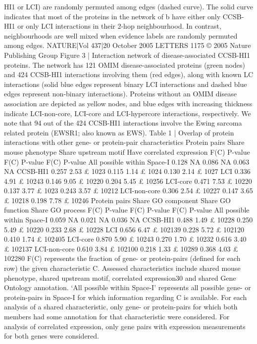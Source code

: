 HI1 or LCI) are randomly permuted among edges (dashed curve). The solid
curve indicates that most of the proteins in the network of b have either only
CCSB-HI1 or only LCI interactions in their 2-hop neighbourhood. In
contrast, neighbourhoods are well mixed when evidence labels are randomly
permuted among edges.
NATURE|Vol 437|20 October 2005
LETTERS
1175
© 2005 Nature Publishing Group
Figure 3 | Interaction network of disease-associated CCSB-HI1
proteins. The network has 121 OMIM disease-associated proteins (green
nodes) and 424 CCSB-HI1 interactions involving them (red edges), along
with known LC interactions (solid blue edges represent binary LCI
interactions and dashed blue edges represent non-binary interactions).
Proteins without an OMIM disease association are depicted as yellow nodes,
and blue edges with increasing thickness indicate LCI-non-core, LCI-core
and LCI-hypercore interactions, respectively. We note that 94 out of the 424
CCSB-HI1 interactions involve the Ewing sarcoma related protein (EWSR1;
also known as EWS).
Table 1 | Overlap of protein interactions with other gene- or protein-pair characteristics
Protein pairs
Share mouse phenotype
Share upstream motif
Have correlated expression
F(C)
P-value
F(C)
P-value
F(C)
P-value
All possible within Space-I
0.128
NA
0.086
NA
0.063
NA
CCSB-HI1
0.257
2.53 £ 1023
0.115
1.14 £ 1024
0.130
2.14 £ 1027
LCI
0.336
4.91 £ 10243
0.146
9.05 £ 10220
0.204
5.45 £ 10256
LCI-core
0.471
7.53 £ 10220
0.137
3.77 £ 1023
0.243
3.57 £ 10212
LCI-non-core
0.306
2.54 £ 10227
0.147
3.65 £ 10218
0.198
7.78 £ 10246
Protein pairs
Share GO component
Share GO function
Share GO process
F(C)
P-value
F(C)
P-value
F(C)
P-value
All possible within Space-I
0.059
NA
0.021
NA
0.036
NA
CCSB-HI1
0.488
1.49 £ 10228
0.250
5.49 £ 10220
0.233
2.68 £ 10228
LCI
0.656
6.47 £ 102139
0.228
5.72 £ 102120
0.410
1.74 £ 102405
LCI-core
0.870
5.90 £ 10243
0.270
1.70 £ 10232
0.616
3.40 £ 102137
LCI-non-core
0.610
3.84 £ 102100
0.218
1.33 £ 10289
0.368
4.03 £ 102280
F(C) represents the fraction of gene- or protein-pairs (deﬁned for each row) the given characteristic C. Assessed characteristics include shared mouse phenotype, shared upstream motif,
correlated expression30 and shared Gene Ontology annotation. ‘All possible within Space-I’ represents all possible gene- or protein-pairs in Space-I for which information regarding C is
available. For each analysis of a shared characteristic, only gene- or protein-pairs for which both members had some annotation for that characteristic were considered. For analysis of
correlated expression, only gene pairs with expression measurements for both genes were considered.
